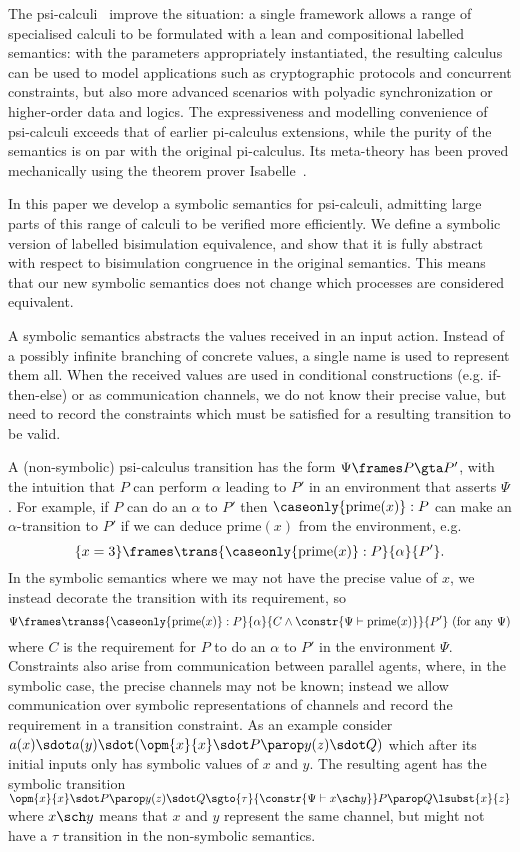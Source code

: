 \documentclass{eptcs}
\theoremstyle{definition}
\begin{document}
The psi-calculi~\cite{bengtson.johansson.ea:psi-calculi} improve the situation: a single framework allows a range of
specialised calculi to be formulated with a lean and compositional labelled
semantics: with the parameters appropriately instantiated, the
resulting calculus can be used to model applications such as
cryptographic protocols and concurrent
constraints, but also more advanced scenarios with polyadic
synchronization or higher-order data and logics.
The expressiveness and modelling convenience of psi-calculi exceeds that
of earlier pi-calculus extensions, while the purity of the semantics
is on par with the original pi-calculus. Its meta-theory has been
proved mechanically using the theorem prover Isabelle~\cite{bengtson.parrow:psi-calculi-isabelle}.

In this paper we develop a symbolic semantics for psi-calculi,
admitting large parts of this range of calculi to be verified more efficiently.
We define a symbolic version of labelled bisimulation equivalence, and
show that it is fully abstract with respect to bisimulation congruence
in the original semantics.  This means that our new symbolic semantics
does not change which processes are considered equivalent.




A symbolic semantics abstracts the values received in an input
action. Instead of a possibly infinite branching of concrete values, a
single name is used to represent them all.  When the received values are
used in conditional constructions (e.g. if-then-else) or as
communication channels, we do not know their precise value, but need to
record the constraints which must be satisfied for a resulting
transition to be valid. 

A (non-symbolic) psi-calculus transition has the form $\Psi\frames P\gta P'$, with
the intuition that $P$ can perform $\alpha$ leading to $P'$ in an
environment that asserts $\Psi$.  
For example, if $P$ can
do an $\alpha$ to $P'$ then $\caseonly{\mathrm{prime}(x)}:{P}$ can make an
$\alpha$-transition
to $P'$ if we can deduce $\mathrm{prime}(x)$ from the environment, 
e.g. 
\[ \{x=3\}\frames \trans{\caseonly{\mathrm{prime}(x)}:{P}}{\alpha}{P'}. \]
In the symbolic semantics where we may not have the precise value of
$x$, we instead decorate the transition with its
requirement, so 
\[
\Psi\frames\transs{\caseonly{\mathrm{prime}(x)}:
P}{\alpha}{C \wedge \constr{\Psi\vdash\mathrm{prime}(x)}}{P'} \text{
(for any $\Psi$)}
\]
where $C$ is the requirement for $P$ to do an $\alpha$ to $P'$ in the
environment $\Psi$.
Constraints also arise from communication between parallel agents,
where, in the symbolic case, the precise channels may not be known;
instead we allow communication over symbolic representations of channels and
record the requirement in a transition constraint. As an example
consider 
$a(x)\sdot a(y)\sdot (\opm{x}{x}\sdot P\parop y(z)\sdot
Q)$ which after its initial inputs only has symbolic values of $x$ and
$y$. The resulting agent has the symbolic transition
$\opm{x}{x}\sdot P\parop y(z)\sdot Q\sgto{\tau}{\constr{\Psi\vdash x\sch y}}P\parop Q\lsubst{x}{z}$ where
$x\sch y$ means that $x$ and $y$ represent the same channel, but might
not have a $\tau$ transition in the non-symbolic semantics.
\end{document}
